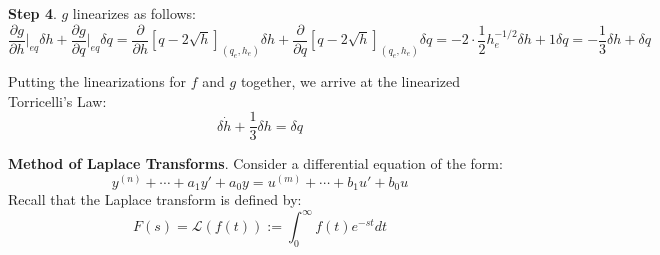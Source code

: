\textbf{Step 4}. $g$ linearizes as follows: \[\frac{\partial g}{\partial h}\bigg\rvert_{eq} \delta h + \frac{\partial g}{\partial q}\bigg\rvert_{eq} \delta q = \frac{\partial}{\partial h}\displaystyle\left[q-2\sqrt{h}\right]_{(q_e, h_e)} \delta h + \frac{\partial}{\partial q}\displaystyle\left[q-2\sqrt{h}\right]_{(q_e,h_e)} \delta q = -2 \cdot \frac{1}{2}h_e^{-1/2} \delta h + 1 \delta q = \boxed{-\frac{1}{3}\delta h + \delta q}\]

Putting the linearizations for $f$ and $g$ together, we arrive at the linearized Torricelli's Law: \[\boxed{\delta \dot h + \frac{1}{3} \delta h = \delta q}\]


\begin{framed}
    \textbf{Method of Laplace Transforms}. Consider a differential equation of the form: \[y^{(n)} + \cdots + a_1 y' + a_0 y = u^{(m)} + \cdots + b_1u' + b_0 u\] Recall that the Laplace transform is defined by: \[F(s) = \mathcal{L}(f(t)) := \int_0^\infty f(t) e^{-st} dt\] 



\end{framed}
